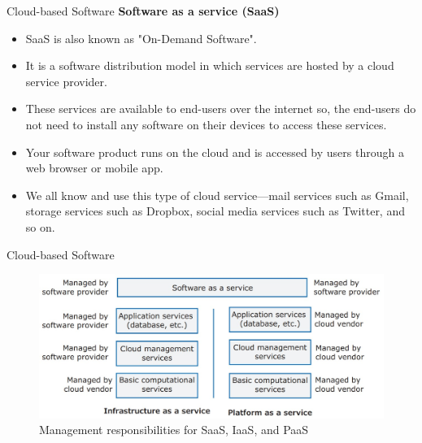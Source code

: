 \documentclass{beamer}
\begin{document}
\begin{frame}{Cloud-based Software}
	\textbf{Software as a service (SaaS) }
	\begin{itemize}
		\item SaaS is also known as "On-Demand Software".
		\item It is a software distribution model in which services are hosted by a cloud service provider. 
		\item These services are available to end-users over the internet so, the end-users do not need to install any software on their devices to access these services.
		\item Your software product runs on the cloud and is accessed by users through a web browser or mobile app.
		\item We all know and use this type of cloud service—mail services such as Gmail, storage services such as Dropbox, social media services such as Twitter, and so on. 
	\end{itemize}
\end{frame}
\begin{frame}{Cloud-based Software}
	\begin{figure}
	\includegraphics[scale=.4]{img/m5_9}
	\caption{Management responsibilities for SaaS, IaaS, and PaaS}
\end{figure}
\end{frame}
\end{document}
